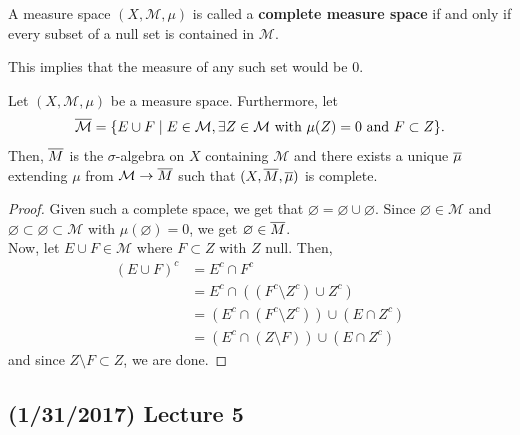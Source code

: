 \documentclass[11pt,leqno,oneside]{amsbook}
\numberwithin{thm}{section}
\newcommand{\M}{\mathcal{M}} %
\newcommand{\s}{$\sigma$-} %
\renewcommand{\emptyset}{\varnothing}
\renewcommand{\de}{\textbf} %
\begin{document}
\begin{defn}
  A measure space $(X,\M,\mu)$ is called a \de{complete measure space}
  if and only if every subset of a null set is contained in $\M$.
\end{defn}
\begin{rmk}
  This implies that the measure of any such set would be 0.
\end{rmk}
\begin{thm}
  Let $(X,\M,\mu)$ be a measure space. Furthermore, let \[
    \ov{\M} = \{E \cup F \st E \in \M, \exists Z \in \M \text{ with }
    \mu(Z) = 0 \text{ and } F \subset Z\}.
  \]
  Then, $\overline{M}$ is the \s algebra on $X$ containing $\M$ and
  there exists a unique $\overline{\mu}$ extending $\mu$ from $\M \to
  \ov{M}$ such that $(X,\overline{M},\overline{\mu})$ is complete.
\end{thm}
\begin{proof}
  Given such a complete space, we get that $\emptyset = \emptyset \cup
  \emptyset$. Since $\emptyset \in \M$  and $\emptyset \subset
  \emptyset \subset \M$ with $\mu(\emptyset) = 0$, we get $\emptyset
  \in \ov{M}$. \\

  Now, let $E \cup F \in \M$ where $F \subset Z$ with $Z$
  null. Then,
  \begin{align*}
    (E \cup F)^c & = E^c \cap F^c \\
                 & = E^c \cap \left( (F^c \setminus Z^c) \cup Z^c \right) \\
    & = \left( E^c \cap (F^c \setminus Z^c) \right) \cup (E \cap Z^c)
    \\
    & = \left( E^c \cap (Z \setminus F) \right) \cup (E \cap Z^c)
  \end{align*}
  and since $Z \setminus F \subset Z$, we are done.
\end{proof}
\subsection*{(1/31/2017) Lecture 5}
\end{document}
